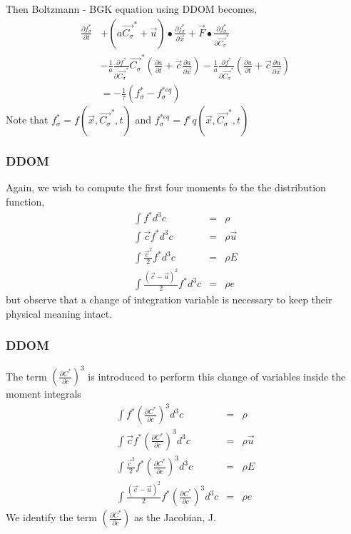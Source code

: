 \begin{frame}
Then Boltzmann - BGK equation using DDOM becomes,
	\begin{equation}
		\begin{split}
			\frac{\partial{f^*_\sigma}}{\partial{t}} &+ (a\vec{C_\sigma}^{*}+\vec{u})\bullet\frac{\partial{f^*_\sigma}}{\partial{\vec{x}}} 
			+\vec{F}\bullet\frac{\partial{f^*_\sigma}}{\partial{\vec{C_\sigma}^{*}}}
			\\ &-\frac{1}{a}\frac{\partial f^*}{\partial \vec{C_\sigma}^*}\vec{C_\sigma}^*\left(\frac{\partial a}{\partial t} + \vec{c} \frac{\partial a}{\partial \vec{x}} \right )
			-\frac{1}{a}\frac{\partial f^*}{\partial \vec{C_\sigma}^*}\left(\frac{\partial u}{\partial t} + \vec{c} \frac{\partial u}{\partial \vec{x}} \right ) 
			\\ &= -\frac{1}{\tau}(f^*_\sigma-f^{*eq}_\sigma)
		\end{split}
	\end{equation}
	Note that $f^*_\sigma = f(\vec{x},\vec{C_\sigma}^{*},t)$ and $f^{*eq}_\sigma=f^eq(\vec{x},\vec{C_\sigma}^{*},t)$
\end{frame}

\begin{frame}
	\frametitle{DDOM}
	Again, we wish to compute the first four moments fo the the distribution function,
	\begin{eqnarray}
	\int f^* d^3 c  &=& \rho \\
	\int \vec{c} f^* d^3 c  &=& \rho \vec{u} \nonumber \\
	\int \frac{\vec{c}^2}{2} f^* d^3 c  &=& \rho E \nonumber \\
	\int \frac{(\vec{c}-\vec{u})^2}{2} f^* d^3 c  &=& \rho e \nonumber
	\end{eqnarray}
	but observe that a change of integration variable is necessary to keep their physical meaning intact.
\end{frame}

\begin{frame}
	\frametitle{DDOM}
	The term $(\frac{\partial C^*}{\partial c} )^3$ is introduced to perform this change of variables inside the moment integrals
	\begin{eqnarray}
		\int f^* \left(\frac{\partial C^*}{\partial c} \right )^3 d^3 c  &=& \rho \\
		\int \vec{c} f^* \left(\frac{\partial C^*}{\partial c} \right )^3 d^3 c &=& \rho \vec{u} \nonumber \\
		\int \frac{\vec{c}^2}{2} f^* \left(\frac{\partial C^*}{\partial c} \right )^3 d^3 c  &=& \rho E \nonumber \\
		\int \frac{(\vec{c}-\vec{u})^2}{2} f^* \left(\frac{\partial C^*}{\partial c} \right )^3 d^3 c &=& \rho e \nonumber
	\end{eqnarray}
	We identify the term $\left(\frac{\partial C^*}{\partial c} \right )$ as the Jacobian, J. 
\end{frame}

